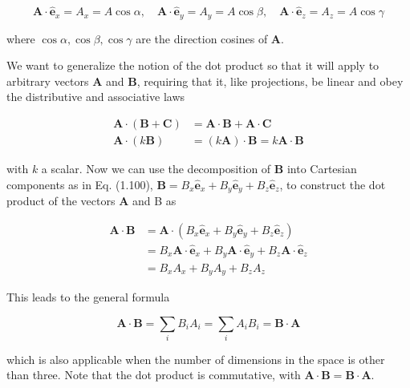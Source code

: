 \documentclass[10pt]{article}
\begin{document}
\begin{equation*}
\mathbf{A} \cdot \hat{\mathbf{e}}_{x}=A_{x}=A \cos \alpha, \quad \mathbf{A} \cdot \hat{\mathbf{e}}_{y}=A_{y}=A \cos \beta, \quad \mathbf{A} \cdot \hat{\mathbf{e}}_{z}=A_{z}=A \cos \gamma \tag{1.104}
\end{equation*}


where $\cos \alpha, \cos \beta, \cos \gamma$ are the direction cosines of $\mathbf{A}$.

We want to generalize the notion of the dot product so that it will apply to arbitrary vectors $\mathbf{A}$ and $\mathbf{B}$, requiring that it, like projections, be linear and obey the distributive and associative laws


\begin{align*}
\mathbf{A} \cdot(\mathbf{B}+\mathbf{C}) & =\mathbf{A} \cdot \mathbf{B}+\mathbf{A} \cdot \mathbf{C}  \tag{1.105}\\
\mathbf{A} \cdot(k \mathbf{B}) & =(k \mathbf{A}) \cdot \mathbf{B}=k \mathbf{A} \cdot \mathbf{B} \tag{1.106}
\end{align*}


with $k$ a scalar. Now we can use the decomposition of $\mathbf{B}$ into Cartesian components as in Eq. (1.100), $\mathbf{B}=B_{x} \hat{\mathbf{e}}_{x}+B_{y} \hat{\mathbf{e}}_{y}+B_{z} \hat{\mathbf{e}}_{z}$, to construct the dot product of the vectors $\mathbf{A}$ and B as


\begin{align*}
\mathbf{A} \cdot \mathbf{B} & =\mathbf{A} \cdot\left(B_{x} \hat{\mathbf{e}}_{x}+B_{y} \hat{\mathbf{e}}_{y}+B_{z} \hat{\mathbf{e}}_{z}\right) \\
& =B_{x} \mathbf{A} \cdot \hat{\mathbf{e}}_{x}+B_{y} \mathbf{A} \cdot \hat{\mathbf{e}}_{y}+B_{z} \mathbf{A} \cdot \hat{\mathbf{e}}_{z} \\
& =B_{x} A_{x}+B_{y} A_{y}+B_{z} A_{z} \tag{1.107}
\end{align*}


This leads to the general formula


\begin{equation*}
\mathbf{A} \cdot \mathbf{B}=\sum_{i} B_{i} A_{i}=\sum_{i} A_{i} B_{i}=\mathbf{B} \cdot \mathbf{A} \tag{1.108}
\end{equation*}


which is also applicable when the number of dimensions in the space is other than three. Note that the dot product is commutative, with $\mathbf{A} \cdot \mathbf{B}=\mathbf{B} \cdot \mathbf{A}$.
\end{document}
